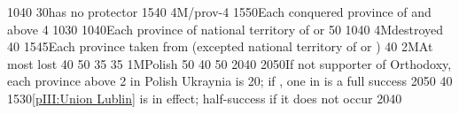 %
%
%
{10}{40}{}%
%
%
{}{30}{\paysPologne has no protector}%
%
%
{15}{40}{}%
%
\EUobjective4M{\payscrimee/\paysmoldavie}{prov-4}%
{15}{50}{Each conquered province of  and  above
  4}%
%
%
%
{10}{30}{\EU@objEachCOL[\granderegionAlaska]}%
%
%
%
{10}{40}{Each province of national territory of \paysgeorgie or \paysperse}%
%
%
{}{50}{}%
%
%
{10}{40}{}%
%
\EUobjective4M{\payscrimee destroyed}{}%
{}{40}{}%
%
%
{15}{45}{Each province taken from \paysmajeurTurquie (excepted national
  territory of \paysgeorgie or \paysperse)}%
%
 
%
%
{}{40}{}%
%
\EUobjective2M{At most \provinceSmolenska lost}{}%
{}{40}{}%
%
%
{}{50}{}%
%
%
{}{35}{}%
%
%
{}{35}{}%
%
%
\EUobjective1M{Polish \provinceSmolenska}{}%
{}{50}{}%
%
%
{}{40}{}%
%
%
{}{50}{}%
%
%
{20}{40}{\EU@objNoRUSBaltique}%
%
%
{20}{50}{If not supporter of Orthodoxy, each province above 2 in Polish
  Ukraynia is 20\VPs; if \Xorthodoxe, one \COL in \continentSiberia is a full
  success}%
%
%
%
{20}{50}{}%
%
%
{}{40}{}%
%
%
{15}{30}{\ref{pIII:Union Lublin} is in effect; half-success if it does not
  occur}%
%
%
{20}{40}{\EU@objNoRUSBaltique}%
